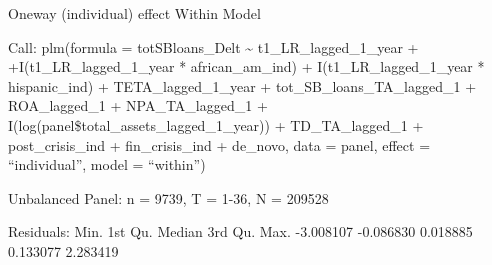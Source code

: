 \documentclass[]{article}
\newenvironment{Shaded}{\begin{snugshade}}{\end{snugshade}}
\newcommand{\DataTypeTok}[1]{\textcolor[rgb]{0.13,0.29,0.53}{#1}}
\newcommand{\DecValTok}[1]{\textcolor[rgb]{0.00,0.00,0.81}{#1}}
\newcommand{\KeywordTok}[1]{\textcolor[rgb]{0.13,0.29,0.53}{\textbf{#1}}}
\newcommand{\NormalTok}[1]{#1}
\newcommand{\OperatorTok}[1]{\textcolor[rgb]{0.81,0.36,0.00}{\textbf{#1}}}
\newcommand{\StringTok}[1]{\textcolor[rgb]{0.31,0.60,0.02}{#1}}
\begin{document}
\begin{Shaded}
\end{Shaded}

Oneway (individual) effect Within Model

Call: plm(formula = totSBloans\_Delt \textasciitilde{}
t1\_LR\_lagged\_1\_year + +I(t1\_LR\_lagged\_1\_year * african\_am\_ind)
+ I(t1\_LR\_lagged\_1\_year * hispanic\_ind) + TETA\_lagged\_1\_year +
tot\_SB\_loans\_TA\_lagged\_1 + ROA\_lagged\_1 + NPA\_TA\_lagged\_1 +
I(log(panel\$total\_assets\_lagged\_1\_year)) + TD\_TA\_lagged\_1 +
post\_crisis\_ind + fin\_crisis\_ind + de\_novo, data = panel, effect =
``individual'', model = ``within'')

Unbalanced Panel: n = 9739, T = 1-36, N = 209528

Residuals: Min. 1st Qu. Median 3rd Qu. Max. -3.008107 -0.086830 0.018885
0.133077 2.283419
\end{document}
